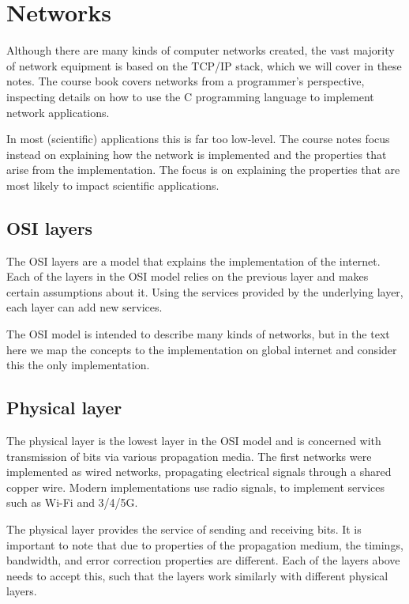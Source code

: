 \chapter{Networks}
\label{chap:network}

Although there are many kinds of computer networks created, the vast majority of network equipment is based on the TCP/IP stack, which we will cover in these notes. The course book covers networks from a programmer’s perspective, inspecting details on how to use the C programming language to implement network applications.

In most (scientific) applications this is far too low-level. The course notes focus instead on explaining how the network is implemented and the properties that arise from the implementation. The focus is on explaining the properties that are most likely to impact scientific applications.

\section{OSI layers}
The OSI layers are a model that explains the implementation of the internet. Each of the layers in the OSI model relies on the previous layer and makes certain assumptions about it. Using the services provided by the underlying layer, each layer can add new services.

The OSI model is intended to describe many kinds of networks, but in the text here we map the concepts to the implementation on global internet and consider this the only implementation.

\section{Physical layer}
The physical layer is the lowest layer in the OSI model and is concerned with transmission of bits via various propagation media. The first networks were implemented as wired networks, propagating electrical signals through a shared copper wire. Modern implementations use radio signals, to implement services such as Wi-Fi and 3/4/5G. 

The physical layer provides the service of sending and receiving bits. It is important to note that due to properties of the propagation medium, the timings, bandwidth, and error correction properties are different. Each of the layers above needs to accept this, such that the layers work similarly with different physical layers.

